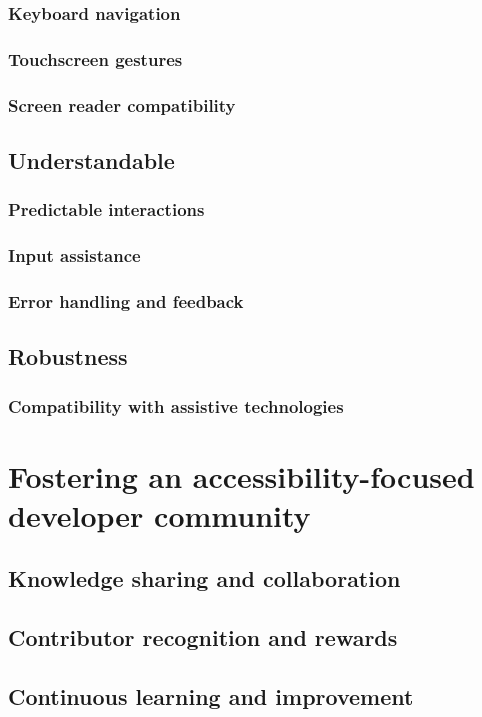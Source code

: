 \subsubsection{Keyboard navigation}

\subsubsection{Touchscreen gestures}

\subsubsection{Screen reader compatibility}

\subsection{Understandable}

\subsubsection{Predictable interactions}

\subsubsection{Input assistance}

\subsubsection{Error handling and feedback}

\subsection{Robustness}

\subsubsection{Compatibility with assistive technologies}

\section{Fostering an accessibility-focused developer community}
\label{sec:community}

\subsection{Knowledge sharing and collaboration}

\subsection{Contributor recognition and rewards}

\subsection{Continuous learning and improvement}

\newpage

